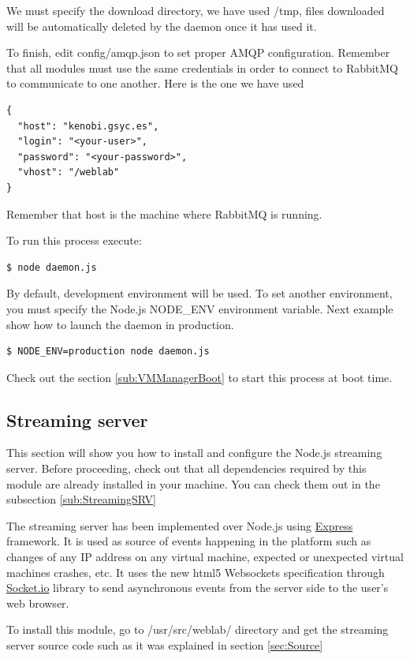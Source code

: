 \documentclass{article}
\begin{document}
We must specify the download directory, we have used /tmp, files downloaded will be automatically deleted by the daemon once it has used it.

To finish, edit config/amqp.json to set proper AMQP configuration. Remember that all modules must use the same credentials in order to connect to RabbitMQ to communicate to one another. Here is the one we have used

\begin{verbatim}
{
  "host": "kenobi.gsyc.es",
  "login": "<your-user>",
  "password": "<your-password>",
  "vhost": "/weblab"
}
\end{verbatim}

Remember that host is the machine where RabbitMQ is running.

To run this process execute:

\begin{verbatim}
$ node daemon.js
\end{verbatim}

By default, development environment will be used. To set another environment, you must specify the Node.js NODE\_ENV environment variable. Next example show how to launch the daemon in production.

\begin{verbatim}
$ NODE_ENV=production node daemon.js
\end{verbatim}

Check out the section \ref{sub:VMManagerBoot} to start this process at boot time.

\subsection{Streaming server}
This section will show you how to install and configure the Node.js streaming server. Before proceeding, check out that all dependencies required by this module are already installed in your machine. You can check them out in the subsection \ref{sub:StreamingSRV}

The streaming server has been implemented over Node.js using \href{http://expressjs.com/}{Express} framework. It is used as source of events happening in the platform such as changes of any IP address on any virtual machine, expected or unexpected virtual machines crashes, etc. It uses the new html5 Websockets specification through \href{http://socket.io/}{Socket.io} library to send asynchronous events from the server side to the user's web browser.

To install this module, go to /usr/src/weblab/ directory and get the streaming server source code such as it was explained in section \ref{sec:Source}
\end{document}
